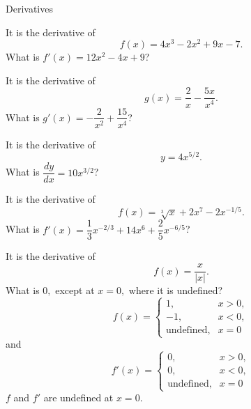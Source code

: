 \documentclass{article}
\begin{document}
\begin{category}{Derivatives}

  \begin{clue}[write]
    It is the derivative of
    \[ f(x) = 4x^3 - 2x^2 + 9x - 7. \]
  \response
    What is $f'(x) = 12x^2 - 4x + 9$?
  \end{clue}

  \begin{clue}[write]
    It is the derivative of
    \[ g(x) = \frac{2}{x} - \frac{5x}{x^4}. \]
  \response
    What is $g'(x) = -\dfrac{2}{x^2} + \dfrac{15}{x^4}$?
  \end{clue}

  \begin{clue}[write]
    It is the derivative of
    \[ y = 4x^{5/2}. \]
  \response
    What is $\dfrac{dy}{dx} = 10x^{3/2}$?
  \end{clue}

  \begin{clue}[write]
    It is the derivative of
    \[ f(x) = \sqrt[3]{x} + 2x^7 - 2x^{-1/5}. \]
  \response
    What is $f'(x) = \dfrac{1}{3}x^{-2/3} + 14x^6 + \dfrac{2}{5}x^{-6/5}$?
  \end{clue}

  \begin{clue}[say]
    It is the derivative of
    \[ f(x) = \frac{x}{|x|}. \]
  \response
    What is $0,$ except at $x = 0,$ where it is undefined?
  \solution
    \[
    f(x) = \begin{cases}
      1, & x > 0, \\
      -1, & x < 0, \\
      \text{undefined}, & x = 0
    \end{cases}
    \]
    and
    \[
    f'(x) = \begin{cases}
      0, & x > 0, \\
      0, & x < 0, \\
      \text{undefined}, & x = 0
    \end{cases}
    \]
    $f$ and $f'$ are undefined at $x = 0.$
  \end{clue}

\end{category}
\end{document}
